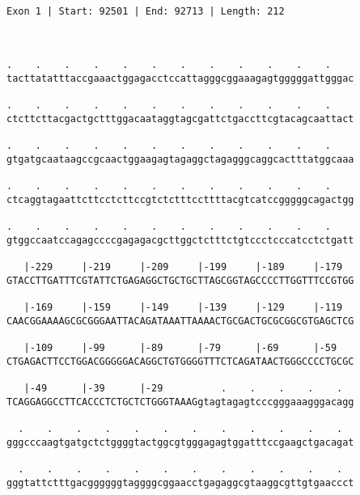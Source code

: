 \documentclass{article}
\begin{document}
 \begin{Verbatim}
 
Exon 1 | Start: 92501 | End: 92713 | Length: 212



.    .    .    .    .    .    .    .    .    .    .    .    
tacttatatttaccgaaactggagacctccattagggcggaaagagtgggggattgggac
                                                            
.    .    .    .    .    .    .    .    .    .    .    .    
ctcttcttacgactgctttggacaataggtagcgattctgaccttcgtacagcaattact
                                                            
.    .    .    .    .    .    .    .    .    .    .    .    
gtgatgcaataagccgcaactggaagagtagaggctagagggcaggcactttatggcaaa
                                                            
.    .    .    .    .    .    .    .    .    .    .    .    
ctcaggtagaattcttcctcttccgtctctttccttttacgtcatccgggggcagactgg
                                                            
.    .    .    .    .    .    .    .    .    .    .    .    
gtggccaatccagagccccgagagacgcttggctctttctgtccctcccatcctctgatt
                                                            
   |-229     |-219     |-209     |-199     |-189     |-179  
GTACCTTGATTTCGTATTCTGAGAGGCTGCTGCTTAGCGGTAGCCCCTTGGTTTCCGTGG
                                                            
   |-169     |-159     |-149     |-139     |-129     |-119  
CAACGGAAAAGCGCGGGAATTACAGATAAATTAAAACTGCGACTGCGCGGCGTGAGCTCG
                                                            
   |-109     |-99      |-89      |-79      |-69      |-59   
CTGAGACTTCCTGGACGGGGGACAGGCTGTGGGGTTTCTCAGATAACTGGGCCCCTGCGC
                                                            
   |-49      |-39      |-29          .    .    .    .    .  
TCAGGAGGCCTTCACCCTCTGCTCTGGGTAAAGgtagtagagtcccgggaaagggacagg
                                                            
  .    .    .    .    .    .    .    .    .    .    .    .  
gggcccaagtgatgctctggggtactggcgtgggagagtggatttccgaagctgacagat
                                                            
  .    .    .    .    .    .    .    .    .    .    .    .  
gggtattctttgacggggggtaggggcggaacctgagaggcgtaaggcgttgtgaaccct
                                                            

\end{Verbatim}
\end{document}

